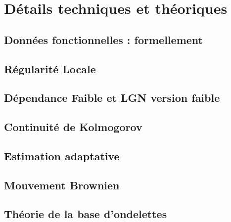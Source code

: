 \chapter{Détails techniques et théoriques}
\minitoc%

\section{Données fonctionnelles : formellement}
\label{annexe:fda-formel}


\section{Régularité Locale}
\label{annexe:regularite-locale}


\section{Dépendance Faible et LGN version faible}
\label{annexe:weak_dep}


\section{Continuité de Kolmogorov}
\label{annexe:continuite_kolmogorov}


\section{Estimation adaptative}
\label{annexe:estim_adapt}


\section{Mouvement Brownien}
\label{annexe:brownien}


\section{Théorie de la base d'ondelettes}
\label{annexe:wavelet}


